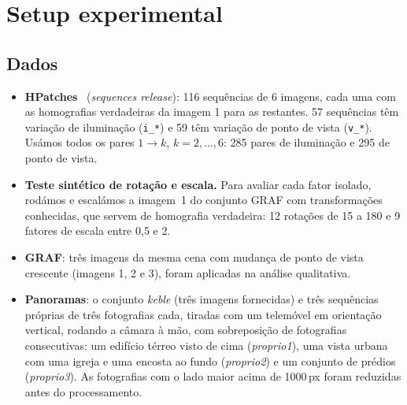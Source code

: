 \documentclass[11pt,a4paper]{article}
\newcommand{\px}{\,px}
\begin{document}
\section{Setup experimental} 

\subsection{Dados}
\begin{itemize}
  \item \textbf{HPatches}~\cite{balntas2017} (\emph{sequences release}): 116 sequências de 6 imagens, cada
  uma com as homografias verdadeiras da imagem 1 para as restantes. 57 sequências têm variação de
  iluminação (\texttt{i\_*}) e 59 têm variação de ponto de vista (\texttt{v\_*}). Usámos todos os pares
  $1\to k$, $k=2,\dots,6$: 285 pares de iluminação e 295 de ponto de vista.
  \item \textbf{Teste sintético de rotação e escala.} Para avaliar cada fator isolado, rodámos e escalámos a imagem~1
  do conjunto GRAF com transformações conhecidas, que servem de homografia verdadeira: 12 rotações de
  15\textdegree{} a 180\textdegree{} e 9 fatores de escala entre 0,5 e 2.
  \item \textbf{GRAF}: três imagens da mesma cena com mudança de ponto de vista crescente (imagens 1, 2 e 3), foram aplicadas na análise qualitativa.
  \item \textbf{Panoramas}: o conjunto \emph{keble} (três imagens fornecidas) e três sequências próprias
  de três fotografias cada, tiradas com um telemóvel em orientação vertical, rodando a câmara à mão, com sobreposição de fotografias consecutivas: um edifício térreo visto de cima (\emph{proprio1}), uma vista urbana com uma igreja e uma encosta ao fundo (\emph{proprio2}) e um conjunto de prédios (\emph{proprio3}). As fotografias com o lado maior acima de 1000\px{} foram reduzidas antes do processamento.
\end{itemize}
\end{document}
